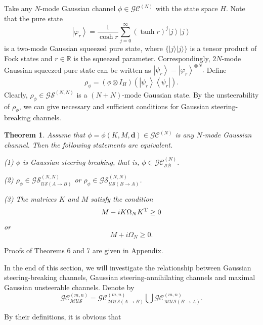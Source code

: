 \documentclass[10pt,aps,pra,amsfonts,amssymb,amsmath,%
floatfix,nofootinbib, groupedaddress,superscriptaddress,citesort,twocolumn
]{revtex4}%
\newtheorem{theorem}{Theorem}
\begin{document}
Take any  $N$-mode Gaussian channel
$\phi\in{\mathcal {GC}}^{(N)}$ with the state space $H$.
 Note that the pure state
 $$\left| {{\varphi _r}} \right\rangle  = \frac{1}{\cosh r}{\sum\limits_{j = 0}^\infty  {\left( {\tanh r} \right)} ^j}\left| j \right\rangle \left| j \right\rangle$$ is a two-mode Gaussian squeezed pure state, where $\{|j\rangle |j\rangle\}$ is  a tensor product of Fock states   and $r\in\mathbb R$ is the squeezed parameter.
 Correspondingly, $2N$-mode Gaussian squeezed pure state can be written as $\left| {{\psi _r}} \right\rangle=\left| {{\varphi _r}} \right\rangle^{\otimes N}.$
Define 
\begin{eqnarray*}\label{N111}
	{\rho_\phi }=  ( \phi  \otimes I_H)( \left| {{\psi _r}} \right\rangle \left\langle {{\psi _r}} \right|).
\end{eqnarray*}
Clearly, $\rho_\phi\in{\mathcal {GS}}^{(N,N)}$ is a $(N+N)$-mode Gaussian state. By the unsteerability of $\rho_\phi$, we can  give   necessary and sufficient conditions for Gaussian steering-breaking  channels.
	
\begin{theorem} \label{TH4}  Assume that  $\phi=\phi \left( {K,M,\mathbf d} \right) \in {\mathcal {GC}}^{(N)}$ is any $N$-mode  Gaussian channel.
	 Then the following statements are equivalent.
			
(1) $\phi$ is Gaussian steering-breaking, that is, $\phi   \in   {\mathcal{GC}}^{(N)}_{\mathcal {SB}}.$
			
(2) $ {\rho _\phi } \in {\mathcal  {GS}^{(N,N)}_{\mathcal {US}(A \rightarrow  B)}}$ or $ {\rho _\phi } \in {\mathcal  {GS}^{(N,N)}_{\mathcal {US}(B \rightarrow  A)}}$.
			
(3) The matrices  $ K$ and $M $ satisfy the condition
$$M-iK \Omega_N K^{\rm T} \ge 0 $$
or $$M+i\Omega_N \ge 0.$$
\end{theorem}
		
Proofs of Theorems 6 and 7 are given in Appendix. 


In the end of this section, we will investigate the  relationship between   Gaussian steering-breaking  channels, Gaussian steering-annihilating  channels and
maximal   Gaussian unsteerable channels. Denote by 
$${\mathcal {GC}}^{(m,n)}_{\mathcal {MUS}}={\mathcal {GC}}^{(m,n)}_{\mathcal {MUS}(A \rightarrow B)} \bigcup {\mathcal {GC}}^{(m,n)}_{\mathcal {MUS}(B \rightarrow A)}. $$


 
By their definitions, it is obvious that
\end{document}
